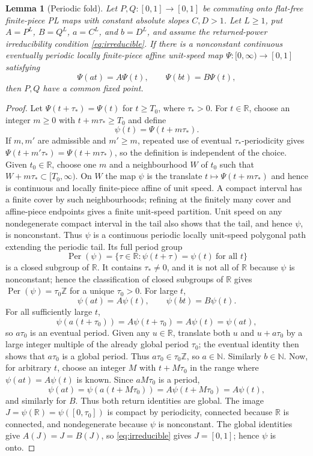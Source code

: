 \documentclass[11pt]{article}
\newtheorem{lemma}[theorem]{Lemma}
\newcommand{\I}{[0,1]}
\begin{document}
\begin{lemma}[Periodic fold]\label{lem:periodic-fold}
Let $P,Q:\I\to\I$ be commuting onto flat-free finite-piece PL maps with constant absolute slopes
$C,D>1$. Let $L\geq1$, put $A=P^L$, $B=Q^L$, $a=C^L$, and $b=D^L$, and assume the returned-power irreducibility
condition \eqref{eq:irreducible}. If there is a nonconstant continuous eventually periodic locally
finite-piece affine unit-speed map $\Psi:[0,\infty)\to\I$ satisfying
\[
\Psi(at)=A\Psi(t),\qquad \Psi(bt)=B\Psi(t),
\]
then $P,Q$ have a common fixed point.
\end{lemma}

\begin{proof}
Let $\Psi(t+\tau_*)=\Psi(t)$ for $t\ge T_0$, where $\tau_*>0$. For $t\in\mathbb R$, choose an
integer $m\ge0$ with $t+m\tau_*\ge T_0$ and define
\[
\psi(t)=\Psi(t+m\tau_*).
\]
If $m,m'$ are admissible and $m'\geq m$, repeated use of eventual $\tau_*$-periodicity gives
$\Psi(t+m'\tau_*)=\Psi(t+m\tau_*)$, so the definition is independent of the choice. Given
$t_0\in\mathbb R$, choose one $m$ and a neighbourhood $W$ of $t_0$ such that
$W+m\tau_*\subset[T_0,\infty)$. On $W$ the map $\psi$ is the translate
$t\mapsto\Psi(t+m\tau_*)$ and hence is continuous and locally finite-piece affine of unit speed. A compact
interval has a finite cover by such neighbourhoods; refining at the finitely many cover and affine-piece
endpoints gives a finite unit-speed partition. Unit speed on any nondegenerate compact interval in the
tail also shows that the tail, and hence $\psi$, is nonconstant. Thus $\psi$ is a continuous periodic locally
unit-speed polygonal path extending the periodic tail. Its full period group
\[
\operatorname{Per}(\psi)=\{\tau\in\mathbb R:\psi(t+\tau)=\psi(t)\ \text{for all }t\}
\]
is a closed subgroup of $\mathbb R$. It contains $\tau_*\ne0$, and it is not all of $\mathbb R$ because
$\psi$ is nonconstant; hence the classification of closed subgroups of $\mathbb R$ gives
$\operatorname{Per}(\psi)=\tau_0\mathbb Z$ for a unique $\tau_0>0$. For large $t$,
\[
\psi(at)=A\psi(t),\qquad \psi(bt)=B\psi(t).
\]
For all sufficiently large $t$,
\[
\psi(a(t+\tau_0))=A\psi(t+\tau_0)=A\psi(t)=\psi(at),
\]
so $a\tau_0$ is an eventual period. Given any $u\in\mathbb R$, translate both $u$ and $u+a\tau_0$
by a large integer multiple of the already global period $\tau_0$; the eventual identity then shows that
$a\tau_0$ is a global period. Thus $a\tau_0\in\tau_0\mathbb Z$, so $a\in\mathbb N$. Similarly
$b\in\mathbb N$. Now, for arbitrary $t$, choose an integer $M$ with $t+M\tau_0$ in the range where
$\psi(at)=A\psi(t)$ is known. Since $aM\tau_0$ is a period,
\[
\psi(at)=\psi(a(t+M\tau_0))=A\psi(t+M\tau_0)=A\psi(t),
\]
and similarly for $B$. Thus both return identities are global. The image
$J=\psi(\mathbb R)=\psi([0,\tau_0])$ is compact by periodicity, connected because $\mathbb R$ is
connected, and nondegenerate because $\psi$ is nonconstant. The global identities give
$A(J)=J=B(J)$, so \eqref{eq:irreducible} gives $J=\I$; hence $\psi$ is onto.


\end{proof}
\end{document}
